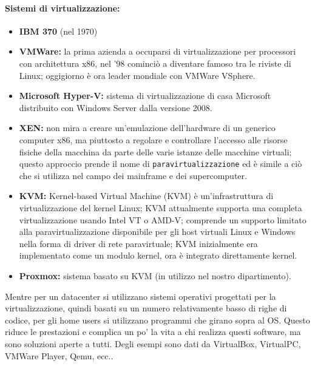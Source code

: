 \documentclass[a4paper]{report}
\begin{document}
\paragraph{Sistemi di virtualizzazione:}
\begin{itemize}
\item \textbf{IBM 370} (nel 1970)
\item \textbf{VMWare:} la prima azienda a occuparsi di virtualizzazione per processori con architettura x86, nel '98 cominciò a diventare famoso tra le riviste di Linux; oggigiorno è ora leader mondiale con VMWare VSphere.
\item \textbf{Microsoft Hyper-V:} sistema di virtualizzazione di casa Microsoft distribuito con Windows Server dalla versione 2008.
\item \textbf{XEN:} non mira a creare un'emulazione dell'hardware di un generico computer x86, ma piuttosto a regolare e controllare l'accesso alle risorse fisiche della macchina da parte delle varie istanze delle macchine virtuali; questo approccio prende il nome di \texttt{paravirtualizzazione} ed è simile a ciò che si utilizza nel campo dei mainframe e dei supercomputer.
\item \textbf{KVM:} Kernel-based Virtual Machine (KVM) è un'infrastruttura di virtualizzazione del kernel Linux; KVM attualmente supporta una completa virtualizzazione usando Intel VT o AMD-V; comprende un supporto limitato alla paravirtualizzazione disponibile per gli host virtuali Linux e Windows nella forma di driver di rete paravirtuale; KVM inizialmente era implementato come un modulo kernel, ora è integrato direttamente kernel.
\item \textbf{Proxmox:} sistema basato su KVM (in utilizzo nel nostro dipartimento).
\end{itemize}
Mentre per un datacenter si utilizzano sistemi operativi progettati per la virtualizzazione, quindi basati su un numero relativamente basso di righe di codice, per gli home users si utilizzano programmi che girano sopra al OS. Questo riduce le prestazioni e complica un po' la vita a chi realizza questi software, ma sono soluzioni aperte a tutti. Degli esempi sono dati da VirtualBox, VirtualPC, VMWare Player, Qemu, ecc..\\
\end{document}
